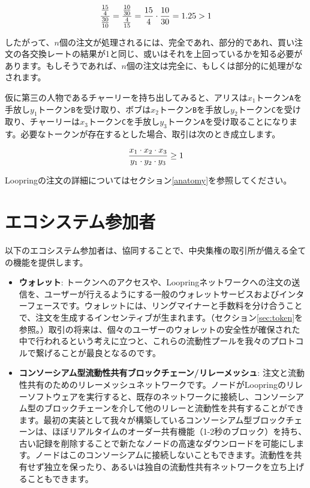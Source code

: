 \documentclass{article}
\begin{document}
\begin{multicols}{2}
\begin{equation}
{{15\over 4} \over {30\over 10}} = {{10\over 30} \over {4\over 15}}={15 \over 4} \cdot {10 \over 30} = 1.25 > 1
\end{equation}

したがって、$n$個の注文が処理されるには、完全であれ、部分的であれ、買い注文の各交換レートの結果が1と同じ、或いはそれを上回っているかを知る必要があります。もしそうであれば、$n$個の注文は完全に、もしくは部分的に処理がなされます。\cite{supersymmetry}

仮に第三の人物であるチャーリーを持ち出してみると、アリスは$x_1$トークン\verb|A|を手放し$y_1$トークン\verb|B|を受け取り、ボブは$x_2$トークン\verb|B|を手放し$y_2$トークン\verb|C|を受け取り、チャーリーは$x_3$トークン\verb|C|を手放し$y_3$トークン\verb|A|を受け取ることになります。必要なトークンが存在するとした場合、取引は次のとき成立します。

\begin{equation}
{{x_1 \cdot x_2 \cdot x_3 \over y_1 \cdot y_2 \cdot y_3} \geq 1}
\end{equation}


Loopringの注文の詳細についてはセクション\ref{anatomy}を参照してください。



\section{エコシステム参加者\label{sec:ecosystem}}
以下のエコシステム参加者は、協同することで、中央集権の取引所が備える全ての機能を提供します。

\begin{itemize}

\item \textbf{ウォレット}: トークンへのアクセスや、Loopringネットワークへの注文の送信を、ユーザーが行えるようにする一般のウォレットサービスおよびインターフェースです。ウォレットには、リングマイナーと手数料を分け合うことで、注文を生成するインセンティブが生まれます。（セクション\ref{sec:token}を参照。）取引の将来は、個々のユーザーのウォレットの安全性が確保された中で行われるという考えに立つと、これらの流動性プールを我々のプロトコルで繋げることが最良となるのです。

\item \textbf{コンソーシアム型流動性共有ブロックチェーン/リレーメッシュ}: 注文と流動性共有のためのリレーメッシュネットワークです。ノードがLoopringのリレーソフトウェアを実行すると、既存のネットワークに接続し、コンソーシアム型のブロックチェーンを介して他のリレーと流動性を共有することができます。最初の実装として我々が構築しているコンソーシアム型ブロックチェーンは、ほぼリアルタイムのオーダー共有機能（1-2秒のブロック）を持ち、古い記録を削除することで新たなノードの高速なダウンロードを可能にします。ノードはこのコンソーシアムに接続しないこともできます。流動性を共有せず独立を保ったり、あるいは独自の流動性共有ネットワークを立ち上げることもできます。


\end{itemize}
\end{multicols}
\end{document}
